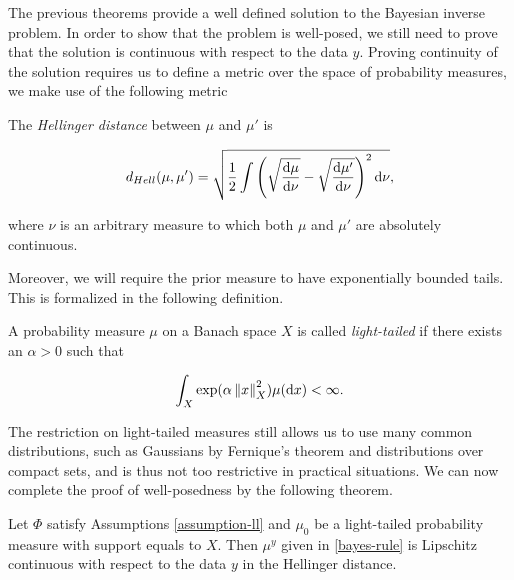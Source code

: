 The previous theorems provide a well defined solution to the Bayesian inverse problem. In order to show that the problem is well-posed, we still need to prove that the solution is continuous with respect to the data $y$. Proving continuity of the solution requires us to define a metric over the space of probability measures, we make use of the following metric

\begin{definition} The \textit{Hellinger distance} between $\mu$ and $\mu'$ is

  \begin{equation*}
    d_{Hell}(\mu, \mu') = \sqrt{\frac12\int\left(\sqrt{\frac{\text{d} \mu}{\text{d} \nu}} - \sqrt{\frac{\text{d} \mu'}{\text{d} \nu}}\right)^2\text{d} \nu},
  \end{equation*}

  where $\nu$ is an arbitrary measure to which both $\mu$ and $\mu'$ are absolutely continuous.
\end{definition}

Moreover, we will require the prior measure to have exponentially bounded tails. This is formalized in the following definition.

\begin{definition}
  A probability measure $\mu$ on a Banach space $X$ is called \textit{light-tailed} if there exists an $\alpha > 0$ such that

  \begin{equation*}
    \int_X\exp(\alpha\left\lVert x\right\rVert^2_X)\mu(\text{d} x) < \infty.
  \end{equation*}
\end{definition}

The restriction on light-tailed measures still allows us to use many common distributions, such as Gaussians by Fernique's theorem and distributions over compact sets, and is thus not too restrictive in practical situations. We can now complete the proof of well-posedness by the following theorem.

\begin{theorem}
  Let $\Phi$ satisfy Assumptions \ref{assumption-ll} and $\mu_0$ be a light-tailed probability measure with support equals to $X$. Then $\mu^y$ given in \ref{bayes-rule} is Lipschitz continuous with respect to the data $y$ in the Hellinger distance.
\end{theorem}


